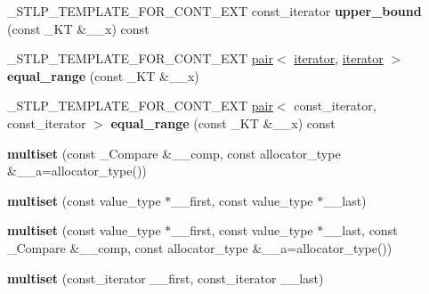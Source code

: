 \begin{DoxyCompactItemize}
\item 
\mbox{\label{classmultiset_aec08cc48bf9ec4661d65b04eff9a4a81}} 
\+\_\+\+S\+T\+L\+P\+\_\+\+T\+E\+M\+P\+L\+A\+T\+E\+\_\+\+F\+O\+R\+\_\+\+C\+O\+N\+T\+\_\+\+E\+XT const\+\_\+iterator {\bfseries upper\+\_\+bound} (const \+\_\+\+KT \&\+\_\+\+\_\+x) const
\item 
\mbox{\label{classmultiset_a9c27a9f51af8a7626f8d5a56a7b5302f}} 
\+\_\+\+S\+T\+L\+P\+\_\+\+T\+E\+M\+P\+L\+A\+T\+E\+\_\+\+F\+O\+R\+\_\+\+C\+O\+N\+T\+\_\+\+E\+XT \hyperlink{structpair}{pair}$<$ \hyperlink{structiterator}{iterator}, \hyperlink{structiterator}{iterator} $>$ {\bfseries equal\+\_\+range} (const \+\_\+\+KT \&\+\_\+\+\_\+x)
\item 
\mbox{\label{classmultiset_aa965715d7640225bbcbc081031b656f8}} 
\+\_\+\+S\+T\+L\+P\+\_\+\+T\+E\+M\+P\+L\+A\+T\+E\+\_\+\+F\+O\+R\+\_\+\+C\+O\+N\+T\+\_\+\+E\+XT \hyperlink{structpair}{pair}$<$ const\+\_\+iterator, const\+\_\+iterator $>$ {\bfseries equal\+\_\+range} (const \+\_\+\+KT \&\+\_\+\+\_\+x) const
\item 
\mbox{\label{classmultiset_a35e151d739fd13d5db8988fd15b22f0a}} 
{\bfseries multiset} (const \+\_\+\+Compare \&\+\_\+\+\_\+comp, const allocator\+\_\+type \&\+\_\+\+\_\+a=allocator\+\_\+type())
\item 
\mbox{\label{classmultiset_ae798d5c3e9d5c4a0641be81a24aeb2a7}} 
{\bfseries multiset} (const value\+\_\+type $\ast$\+\_\+\+\_\+first, const value\+\_\+type $\ast$\+\_\+\+\_\+last)
\item 
\mbox{\label{classmultiset_a8c577f22e841e50a4227638a2f546b6f}} 
{\bfseries multiset} (const value\+\_\+type $\ast$\+\_\+\+\_\+first, const value\+\_\+type $\ast$\+\_\+\+\_\+last, const \+\_\+\+Compare \&\+\_\+\+\_\+comp, const allocator\+\_\+type \&\+\_\+\+\_\+a=allocator\+\_\+type())
\item 
\mbox{\label{classmultiset_a38f983aa3e7c5b7a149e54de15727354}} 
{\bfseries multiset} (const\+\_\+iterator \+\_\+\+\_\+first, const\+\_\+iterator \+\_\+\+\_\+last)
\item 
\mbox{\label{classmultiset_ad5333cd035f9c46b774fc9f628137a3b}} 

\end{DoxyCompactItemize}
